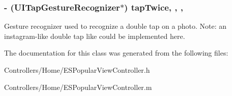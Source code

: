 \subsubsection[{tap\+Twice}]{\setlength{\rightskip}{0pt plus 5cm}-\/ (U\+I\+Tap\+Gesture\+Recognizer$\ast$) tap\+Twice\hspace{0.3cm}{\ttfamily [read]}, {\ttfamily [write]}, {\ttfamily [nonatomic]}, {\ttfamily [strong]}}\label{interface_e_s_popular_view_controller_a528b61c52344c48fdb8b34c522722b98}
Gesture recognizer used to recognize a double tap on a photo. Note\+: an instagram-\/like double tap like could be implemented here. 

The documentation for this class was generated from the following files\+:\begin{DoxyCompactItemize}
\item 
Controllers/\+Home/E\+S\+Popular\+View\+Controller.\+h\item 
Controllers/\+Home/E\+S\+Popular\+View\+Controller.\+m\end{DoxyCompactItemize}
